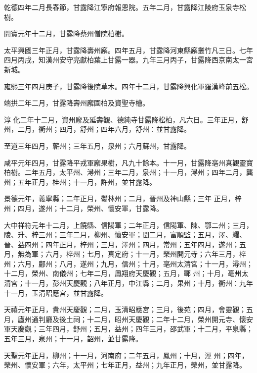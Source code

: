 \begin{pinyinscope}
 乾德四年二月長春節，甘露降江寧府報恩院。五年二月，甘露降江陵府玉泉寺松樹。



 開寶元年十二月，甘露降蔡州僧院柏樹。



 太平興國三年正月，甘露降壽州廨。四年五月，甘露降河東縣廨叢竹凡三日。七年四月丙戌，知漢州安守亮獻柏葉上甘露一器。九年三月丙子，甘露降西京南太一宮新城。



 雍熙三年四月庚子，甘露降後院草木。四年十二月，甘露降興化軍羅漢峰前五松。



 端拱二年二月，甘露降壽州廨園柏及資聖寺檜。



 淳
 化二年十二月，資州廨及延壽觀、德純寺甘露降松柏，凡六日。三年正月，舒州，二月，衢州；四月，舒州；四年六月，舒州：並甘露降。



 至道三年四月，蘄州；三年五月，泉州；六月蘇州，甘露降。



 咸平元年四月，甘露降平戎軍廨果樹，凡九十餘本。十一月，甘露降亳州真觀靈寶柏樹。二年五月，太平州、潯州；三年二月，泉州；十一月，潯州；四年二月，龔州；五年正月，桂州；十一月，許州，並甘露降。



 景德元年，義寧縣；二年正月，鬱林州；二月，晉州及神山縣；三年
 正月，梓州；四月，遂州；十二月，榮州、懷安軍，甘露降。



 大中祥符元年十二月，上饒縣、信陽軍；二年正月，信陽軍、陳、鄂二州；三月，陵、升、梓三州；三年二月，柳州、懷安軍；閏二月，富順監；五月，澤、耀、晉、益四州；四年正月，梓州；三月，澤州；四月，常州；五年四月，遂州；五月，無為軍；六月，梓州；七月，真定府；十一月，榮州開元寺；六年三月，梓州；六月，鄜州；八月，遂州；九月，信州；十月，亳州太清宮；十一月，潯州；十二月，榮州、南儀州；七年二月，鳳翔府天慶觀；五月，鄆
 州；十月，亳州太清宮；十一月，彭州天慶觀；八年正月，中江縣；二月，果州；十月，衢州：九年十一月，玉清昭應宮，並甘露降。



 天禧元年正月，貴州天慶觀；二月，玉清昭應宮；三月，後苑；四月，會靈觀；五月，廬州通判廳及後土祠；十二月，昭州天慶觀；二年十二月，榮州開元寺、懷安軍天慶觀；三年四月，舒州；五月，益州；四年三月，邵武軍；十二月，平泉縣；五年三月，泉州；十一月，韶州，並甘露降。



 天聖元年正月，柳州；十一月，河南府；二年五月，鳳州；十月，涇
 州；四年，榮州、懷安軍；六年，太平州；七年正月，益州；九年正月，榮州，並甘露降。




\end{pinyinscope}
